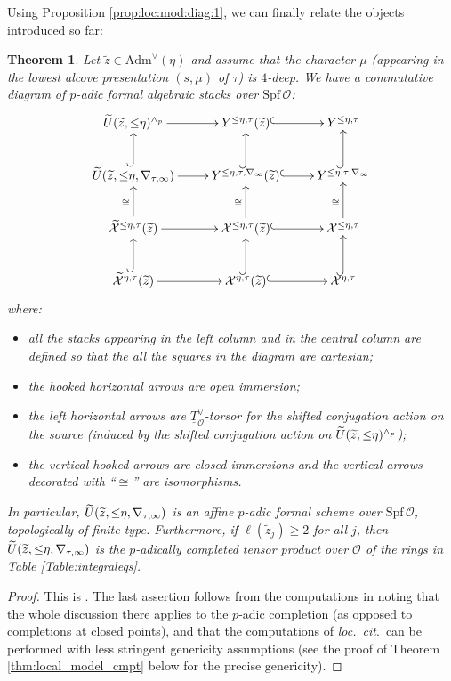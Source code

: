 \documentclass[oneside,a4paper,english, 11pt]{amsart}
\theoremstyle{plain}
\newtheorem{thm}{Theorem}[subsection]
\theoremstyle{plain}
\theoremstyle{plain}
\theoremstyle{plain}
\theoremstyle{plain}
\theoremstyle{plain}
\theoremstyle{definition}
\theoremstyle{definition}
\theoremstyle{definition}
\theoremstyle{remark}
\numberwithin{equation}{section}
\newcommand{\cO}{\mathcal{O}}
\newcommand{\cX}{\mathcal{X}}
\newcommand{\Adm}{\mathrm{Adm}}
\newcommand{\un}[1]{\underline{#1}}
\newcommand{\tld}[1]{\widetilde{#1}}
\newcommand{\Spf}{\mathrm{Spf}}
\DeclareMathOperator{\leqeta}{\text{$\setlength{\thickmuskip}{0mu}\leq\eta$}}
\begin{document}
Using Proposition \ref{prop:loc:mod:diag:1}, we can finally relate the objects introduced so far:
\begin{thm}
\label{prop:loc:mod:diag:2}
Let $\tld{z}\in\Adm^{\vee}(\eta)$ and assume that the character $\mu$ (appearing in the lowest alcove presentation $(s,\mu)$ of $\tau$) is $4$-deep.
We have a commutative diagram of $p$-adic formal algebraic stacks over $\Spf\,\cO$:
\[
\xymatrix{
\tld{U}(\tld{z},\leqeta)^{\wedge_p}\ar[r]& Y^{\leqeta,\tau}(\tld{z})\ar@{^{(}->}[r]& Y^{\leqeta,\tau}\\
\tld{U}(\tld{z},\leqeta,\nabla_{\tau,\infty})\ar[r]\ar@{^{(}->}[u]& Y^{\leqeta,\tau,\nabla_\infty}(\tld{z})\ar@{^{(}->}[r]\ar@{^{(}->}[u]& Y^{\leqeta,\tau,\nabla_\infty}
\ar@{^{(}->}[u]
\\
\tld{\cX}^{\leq \eta,\tau}(\tld{z})
\ar[r]\ar[u]^{\cong}& \cX^{\leq \eta,\tau}(\tld{z})\ar@{^{(}->}[r]\ar[u]^{\cong}&  \cX^{\leq \eta,\tau}
\ar[u]^{\cong}\\
\tld{\cX}^{\eta,\tau}(\tld{z})
\ar[r]\ar@{^{(}->}[u]& \cX^{\eta,\tau}(\tld{z})\ar@{^{(}->}[r]\ar@{^{(}->}[u]&  \cX^{\eta,\tau}
\ar@{^{(}->}[u]}
\]
where:
\begin{itemize}
\item all the stacks appearing in the left column and in the central column 
%
are \emph{defined} so that the all the squares in the diagram are cartesian; 
\item the hooked horizontal arrows are open immersion;
\item the left horizontal arrows are $\un{T}^{\vee}_{\cO}$-torsor for the shifted conjugation action on the source (induced by the shifted conjugation action on  $\tld{U}(\tld{z},\leqeta)^{\wedge_p}$);
\item the vertical hooked arrows are closed immersions and the vertical arrows decorated with ``$\cong$'' are isomorphisms.
%
\end{itemize}
In particular, $\tld{U}(\tld{z},\leqeta,\nabla_{\tau,\infty})$ is an affine $p$-adic formal scheme over $\Spf\,\cO$, topologically of finite type. 
Furthermore, if $\ell(\tld{z}_j) \geq 2$ for all $j$, then $\tld{U}(\tld{z},\leqeta,\nabla_{\tau,\infty})$ is the $p$-adically completed tensor product over $\cO$ of the rings in Table \ref{Table:integraleqs}. 
%
%
\end{thm}
\begin{proof} This is \cite[Proposition 7.2.3]{MLM}. 
The last assertion follows from the computations in \cite[\S 5.3]{LLLM} noting that the whole discussion there applies to the $p$-adic completion (as opposed to completions at closed points), and that the computations of \emph{loc.~cit}.~can be performed with less stringent genericity assumptions (see the proof of Theorem \ref{thm:local_model_cmpt} below for the precise genericity).
%
%
\end{proof}
\end{document}

